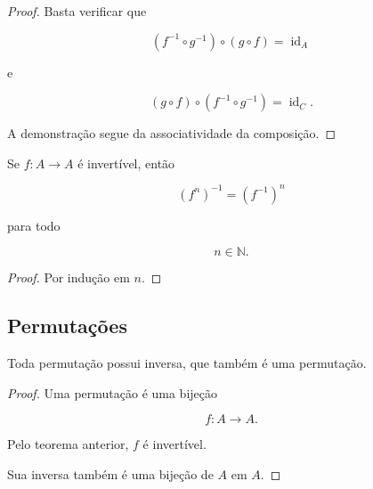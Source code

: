 \documentclass[../../main]{subfiles}
\begin{document}
\begin{proof}

	Basta verificar que

	\[
		(f^{-1}\circ g^{-1})
		\circ
		(g\circ f)
		=
		\operatorname{id}_A
	\]

	e

	\[
		(g\circ f)
		\circ
		(f^{-1}\circ g^{-1})
		=
		\operatorname{id}_C.
	\]

	A demonstração segue da associatividade da composição.

\end{proof}

\begin{prop}
	\label{prop:matematica:funcoes:funcoes-inversas:potencia}

	Se \(f:A\to A\) é invertível, então

	\[
		(f^n)^{-1}
		=
		(f^{-1})^n
	\]

	para todo

	\[
		n\in\mathbb N.
	\]

\end{prop}

\begin{proof}

	Por indução em \(n\).

\end{proof}

\subsection{Permutações}

\begin{prop}
	\label{prop:matematica:funcoes:funcoes-inversas:permutacao}

	Toda permutação possui inversa, que também é uma permutação.

\end{prop}

\begin{proof}

	Uma permutação é uma bijeção

	\[
		f:A\to A.
	\]

	Pelo teorema anterior, \(f\) é invertível.

	Sua inversa também é uma bijeção de \(A\) em \(A\).

\end{proof}
\end{document}
